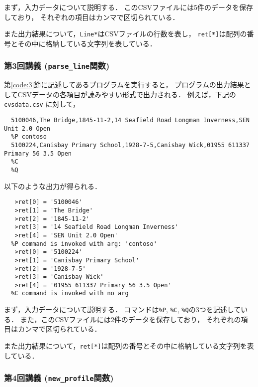 \documentclass[autodetect-engine,dvi=dvipdfmx,ja=standard,
               a4j,11pt]{bxjsarticle}
\begin{document}
まず，入力データについて説明する．
このCSVファイルには5件のデータを保存しており，
それぞれの項目はカンマで区切られている．

また出力結果について，\verb|Line*|はCSVファイルの行数を表し，
\verb|ret[*]|は配列の番号とその中に格納している文字列を表している．

\subsubsection{第3回講義 (\texttt{parse\_line}関数)}

第\ref{code:3}節に記述してあるプログラムを実行すると，
プログラムの出力結果としてCSVデータの各項目が読みやすい形式で出力される．
例えば，下記の \verb|cvsdata.csv| に対して，

{\fontsize{10pt}{11pt} \selectfont
 \begin{verbatim}
  5100046,The Bridge,1845-11-2,14 Seafield Road Longman Inverness,SEN Unit 2.0 Open
  %P contoso
  5100224,Canisbay Primary School,1928-7-5,Canisbay Wick,01955 611337 Primary 56 3.5 Open
  %C
  %Q
 \end{verbatim}
}

\noindent
以下のような出力が得られる．

{\fontsize{10pt}{11pt} \selectfont
 \begin{verbatim}
   >ret[0] = '5100046'
   >ret[1] = 'The Bridge'
   >ret[2] = '1845-11-2'
   >ret[3] = '14 Seafield Road Longman Inverness'
   >ret[4] = 'SEN Unit 2.0 Open'
  %P command is invoked with arg: 'contoso'
   >ret[0] = '5100224'
   >ret[1] = 'Canisbay Primary School'
   >ret[2] = '1928-7-5'
   >ret[3] = 'Canisbay Wick'
   >ret[4] = '01955 611337 Primary 56 3.5 Open'
  %C command is invoked with no arg
 \end{verbatim}
}

まず，入力データについて説明する．
コマンドは\verb|%P|, \verb|%C|, \verb|%Q|の3つを記述している．
また，このCSVファイルには2件のデータを保存しており，
それぞれの項目はカンマで区切られている．

また出力結果について，\verb|ret[*]|は配列の番号とその中に格納している文字列を表している．

\subsubsection{第4回講義 (\texttt{new\_profile}関数)}
\end{document}
